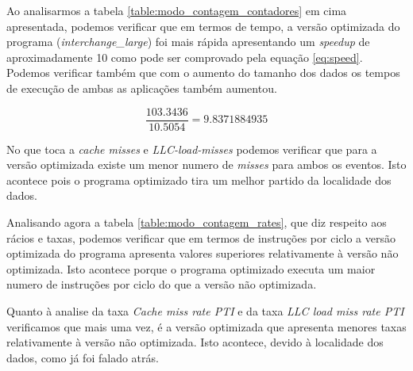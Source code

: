 \documentclass[conference,compsoc]{IEEEtran}
\begin{document}
Ao analisarmos a tabela \ref{table:modo_contagem_contadores} em cima apresentada, podemos verificar que em termos de tempo, a versão optimizada do programa (\textit{interchange\_large}) foi mais rápida apresentando um \textit{speedup} de aproximadamente 10 como pode ser comprovado pela equação \ref{eq:speed}. Podemos verificar também que com o aumento do tamanho dos dados os tempos de execução de ambas as aplicações também aumentou.

\begin{equation}
\label{eq:speed}
	\frac{103.3436}{10.5054} = 9.8371884935
\end{equation}

No que toca a \textit{cache misses} e \textit{LLC-load-misses} podemos verificar que para a versão optimizada existe um menor numero de \textit{misses} para ambos os eventos. Isto acontece pois o programa optimizado tira um melhor partido da localidade dos dados.

Analisando agora a tabela \ref{table:modo_contagem_rates}, que diz respeito aos rácios e taxas, podemos verificar que em termos de instruções por ciclo a versão optimizada do programa apresenta valores superiores relativamente à versão não optimizada. Isto acontece porque o programa optimizado executa um maior numero de instruções por ciclo do que a versão não optimizada.

Quanto à analise da taxa \textit{Cache miss rate PTI} e da taxa \textit{LLC load miss rate PTI } verificamos que mais uma vez, é a versão optimizada que apresenta menores taxas relativamente à versão não optimizada. Isto acontece, devido à localidade dos dados, como já foi falado atrás.
\end{document}
